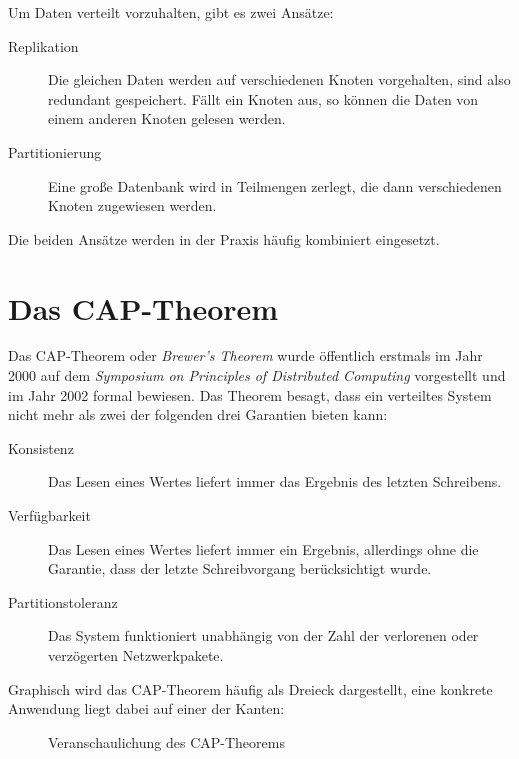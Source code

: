 \documentclass[a4paper,11pt]{scrartcl}
\begin{document}
  Um Daten verteilt vorzuhalten, gibt es zwei
  Ansätze:\cite[S.~147]{kleppmann17}

  \begin{description}
    \item[Replikation] Die gleichen Daten werden auf verschiedenen Knoten
      vorgehalten, sind also redundant gespeichert. Fällt ein Knoten aus, so
      können die Daten von einem anderen Knoten gelesen werden.
    \item[Partitionierung] Eine große Datenbank wird in Teilmengen zerlegt, die
      dann verschiedenen Knoten zugewiesen werden.
  \end{description}

  Die beiden Ansätze werden in der Praxis häufig kombiniert eingesetzt.

  \section{Das CAP-Theorem}
  Das CAP-Theorem oder \textit{Brewer's Theorem} wurde öffentlich erstmals im
  Jahr 2000 auf dem \textit{Symposium on Principles of Distributed Computing}
  vorgestellt und im Jahr 2002 formal bewiesen. Das Theorem besagt, dass ein
  verteiltes System nicht mehr als zwei der folgenden drei Garantien bieten
  kann:\cite[S.~51-59]{brewer02}

  \begin{description}
    \item[Konsistenz] Das Lesen eines Wertes liefert immer das Ergebnis des
      letzten Schreibens.
    \item[Verfügbarkeit] Das Lesen eines Wertes liefert immer ein Ergebnis,
      allerdings ohne die Garantie, dass der letzte Schreibvorgang berücksichtigt
      wurde.
    \item[Partitionstoleranz] Das System funktioniert unabhängig von der Zahl der
      verlorenen oder verzögerten Netzwerkpakete.
  \end{description}

  Graphisch wird das CAP-Theorem häufig als Dreieck dargestellt, eine konkrete
  Anwendung liegt dabei auf einer der Kanten:

  \begin{figure}[!h]
    \centering
    \caption{Veranschaulichung des CAP-Theorems}
  \end{figure}
\end{document}
